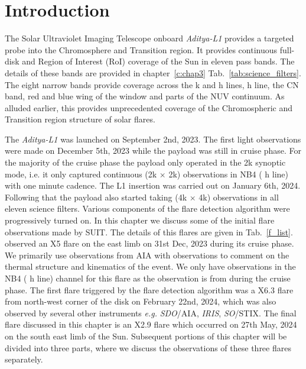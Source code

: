 \justifying

\section{Introduction} \label{sec:intro}

The Solar Ultraviolet Imaging Telescope onboard {\it Aditya-L1} \citep[{\it Aditya-L1}/SUIT,][]{article,ghosh16,adityal1,suit_main} provides a targeted probe into the Chromosphere and Transition region. It provides continuous full-disk and Region of Interest (RoI) coverage of the Sun in eleven pass bands. The details of these bands are provided in chapter~\ref{c:chap3} Tab.~\ref{tab:science_filters}. The eight narrow bands provide coverage across the  k and h lines,  h line, the CN band, red and blue wing of the  window and parts of the NUV continuum. As alluded earlier, this provides unprecedented coverage of the Chromospheric and Transition region structure of solar flares.

The {\it Aditya-L1} was launched on September 2nd, 2023. The first light observations were made on December 5th, 2023 while the payload was still in cruise phase. For the majority of the cruise phase the payload only operated in the 2k synoptic mode, i.e. it only captured continuous (2k $\times$ 2k) observations in NB4 ( h line) with one minute cadence. The L1 insertion was carried out on January 6th, 2024. Following that the payload also started taking (4k $\times$ 4k) observations in all eleven science filters. Various components of the flare detection algorithm were progressively turned on. In this chapter we discuss some of the initial flare observations made by SUIT. The details of this flares are given in Tab.~\ref{f_list}. {\suit} observed an X5 flare on the east limb on 31st Dec, 2023 during its cruise phase. We primarily use observations from AIA with {\suit} observations to comment on the thermal structure and kinematics of the event.  We only have observations in the NB4 ( h line) channel for this flare as the observation is from during the cruise phase. The first flare triggered by the flare detection algorithm was a X6.3 flare from north-west corner of the disk on February 22nd, 2024, which was also observed by several other instruments {\it e.g.} {\it SDO}/AIA, {\it IRIS}, {\it SO}/STIX. The final flare discussed in this chapter is an X2.9 flare which occurred on 27th May, 2024 on the south east limb of the Sun. Subsequent portions of this chapter will be divided into three parts, where we discuss the observations of these three flares separately.

